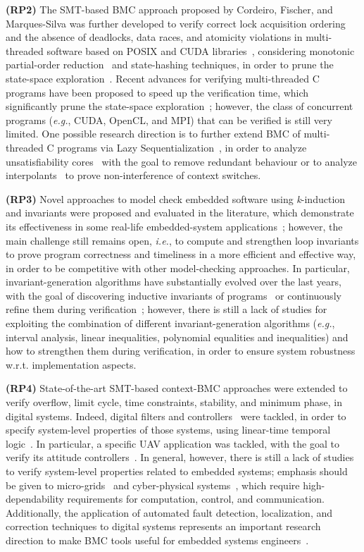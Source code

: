\documentclass{acm_sen_article}
\begin{document}
\textbf{(RP2)} The SMT-based BMC approach proposed by Cordeiro, Fischer, and Marques-Silva was further developed to verify correct lock acquisition ordering and the absence of deadlocks, data races, and atomicity violations in multi-threaded software based on POSIX and CUDA libraries~\cite{CordeiroF11,Pereira15}, considering monotonic partial-order reduction~\cite{KahlonWG09} and state-hashing techniques, in order to prune the state-space exploration~\cite{morse15}. Recent advances for verifying multi-threaded C programs have been proposed to speed up the verification time, which significantly prune the state-space exploration~\cite{Inverso14,civl15}; however, the class of concurrent programs ({\it e.g.}, CUDA, OpenCL, and MPI) that can be verified is still very limited. One possible research direction is to further extend BMC of multi-threaded C programs via Lazy Sequentialization~\cite{Inverso14}, in order to analyze unsatisfiability cores~\cite{Grumberg05} with the goal to remove redundant behaviour or to analyze interpolants~\cite{McMillan11} to prove non-interference of context switches.

\textbf{(RP3)} Novel approaches to model check embedded software using \textit{k}-induction and invariants were proposed and evaluated in the literature, which demonstrate its effectiveness in some real-life embedded-system applications~\cite{Gadelha15,Brain15,Rocha15,Donaldson10}; however, the main challenge still remains open, {\it i.e.}, to compute and strengthen loop invariants to prove program correctness and timeliness in a more efficient and effective way, in order to be competitive with other model-checking approaches. In particular, invariant-generation algorithms have substantially evolved over the last years, with the goal of discovering inductive invariants of programs~\cite{pips:2013,Henry:2012} or continuously refine them during verification~\cite{Beyer15}; however, there is still a lack of studies for exploiting the combination of different invariant-generation algorithms ({\it e.g.}, interval analysis, linear inequalities, polynomial equalities and inequalities) and how to strengthen them during verification, in order to ensure system robustness w.r.t. implementation aspects.

\textbf{(RP4)} State-of-the-art SMT-based context-BMC approaches were extended to verify overflow, limit cycle, time constraints, stability, and minimum phase, in digital systems. Indeed, digital filters and controllers~\cite{dsv_spin2015,esbmc_controller,esbmc_filter} were tackled, in order to specify system-level properties of those systems, using linear-time temporal logic~\cite{JMorse15}. In particular, a specific UAV application was tackled, with the goal to verify its attitude controllers~\cite{Bessa16}. In general, however, there is still a lack of studies to verify system-level properties related to embedded systems; emphasis should be given to micro-grids~\cite{xu15} and cyber-physical systems~\cite{leeCPS2}, which require high-dependability requirements for computation, control, and communication. Additionally, the application of automated fault detection, localization, and correction techniques to digital systems represents an important research direction to make BMC tools useful for embedded systems engineers~\cite{Alves15}.
\end{document}
